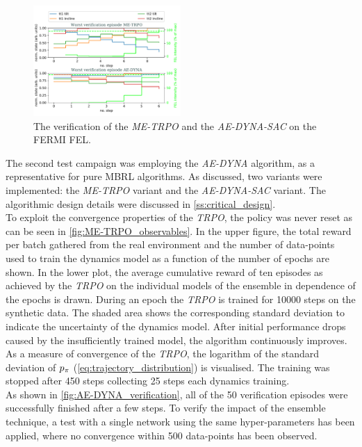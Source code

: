 \documentclass[
reprint,
amsmath,amssymb,amsfonts,clevref,
aps,
prstab,
]{revtex4-2}
\begin{document}
	\begin{figure}
	\centering
	\includegraphics*[width=0.5\textwidth]{Figures/Worst_episode_MBRL.pdf}
	\caption{The verification of the \emph{ME-TRPO} and the \emph{AE-DYNA-SAC} on the FERMI FEL.}
	\label{fig:Worst_episode_MBRL}
	\end{figure}
	The second test campaign was employing the \emph{AE-DYNA} algorithm, as a representative for pure MBRL algorithms. As discussed, two variants were implemented: the \emph{ME-TRPO} variant and the \emph{AE-DYNA-SAC} variant. The algorithmic design details were discussed in \cref{ss:critical_design}. 
	\\ To exploit the convergence properties of the \emph{TRPO}, the policy was never reset as can be seen in \cref{fig:ME-TRPO_observables}. In the upper figure, the total reward per batch gathered from the real environment and the number of data-points used to train the dynamics model as a function of the number of epochs are shown. In the lower plot, the average cumulative reward of ten episodes as achieved by the \emph{TRPO} on the individual models of the ensemble in dependence of the epochs is drawn. During an epoch the \emph{TRPO} is trained for 10000 steps on the synthetic data. The shaded area shows the corresponding standard deviation to indicate the uncertainty of the dynamics model. After initial performance drops caused by the insufficiently trained model, the algorithm continuously improves. As a measure of convergence of the \emph{TRPO}, the logarithm of the standard deviation of $p_\pi$ (\cref{eq:trajectory_distribution}) is visualised. The training was stopped after 450 steps collecting 25 steps each dynamics training.
	\\ As shown in \cref{fig:AE-DYNA_verification}, all of the 50 verification episodes were successfully finished after a few steps. To verify the impact of the ensemble technique, a test with a single network using the same hyper-parameters has been applied, where no convergence within 500 data-points has been observed. \\
\end{document}
